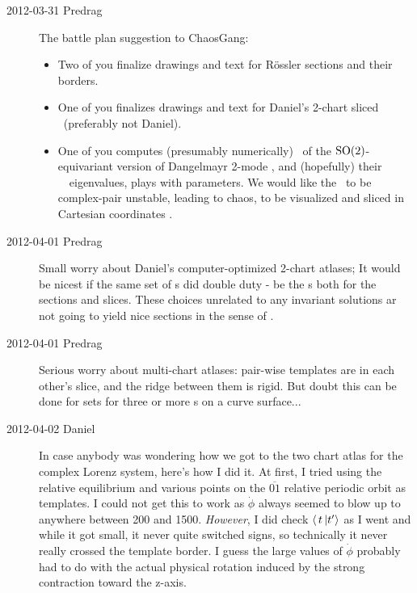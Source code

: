 \begin{description}
\item[2012-03-31 Predrag] The battle plan suggestion to ChaosGang:
\begin{itemize}
  \item
        Two of you finalize drawings and text for R\"ossler sections and
        their borders.
  \item
        One of you finalizes drawings and text for Daniel's 2-chart
        sliced \cLe\ (preferably not Daniel).
  \item
        One of you computes (presumably numerically) \reqva\ of the
        $\textrm{SO}(2)$-equivariant version of Dangelmayr 2-mode
        , and (hopefully) their \stabmat\ \Mvar\
        eigenvalues, plays with parameters. We would like the \reqva\ to
        be complex-pair unstable, leading to chaos, to be visualized and
        sliced in Cartesian coordinates \refeq{eq:AGH}.
\end{itemize}

\item[2012-04-01 Predrag] Small worry about Daniel's computer-optimized
2-chart atlases; It would be nicest if the same set of {\template s} did
double duty - be the {\template s} both for the sections and slices.
These choices unrelated to any invariant solutions ar not going to yield
nice sections in the sense of \reffig{fig:A29PoincBad}.

\item[2012-04-01 Predrag] Serious worry about multi-chart atlases:
pair-wise templates are in each other's slice, and the ridge between them
is rigid. But doubt this can be done for sets for three or more
{\template s} on a curve surface...

\item[2012-04-02 Daniel] In case anybody was wondering how we got to the two chart atlas for the complex Lorenz system, here's how I did it. At first, I tried using the relative equilibrium and various points on the $\overline{01}$ relative periodic orbit as templates. I could not get this to work as $\dot{\phi}$ always seemed to blow up to anywhere between 200 and 1500. \emph{However}, I did check $\braket{\,t\,}{\sliceTan{}{}}$ as I went and while it got small, it never quite switched signs, so technically it never really crossed the template border. I guess the large values of $\dot{\phi}$ probably had to do with the actual physical rotation induced by the strong contraction toward the z-axis. 


\end{description}
